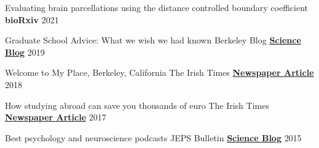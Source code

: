 

\begin{cvhonors}

  \cvhonor
    {Evaluating brain parcellations using the distance controlled boundary coefficient} %
    {}
    {{\textbf{bioRxiv}}}
    {2021}
    
\end{cvhonors}


\begin{cvhonors}

  \cvhonor
    {Graduate School Advice: What we wish we had known} %
    {Berkeley Blog}
    {\href{https://psychblog.berkeley.edu/opinion/2019/09/09/Graduate-School-Advice/}{\textbf{Science Blog}}}
    {2019}

  \cvhonor
    {Welcome to My Place, Berkeley, California} %
    {The Irish Times}
    {\href{https://www.irishtimes.com/life-and-style/abroad/welcome-to-my-place-berkeley-california-1.3325991}{\textbf{Newspaper Article}}}
    {2018}
    
  \cvhonor
    {How studying abroad can save you thousands of euro} %
    {The Irish Times}
    {\href{https://www.irishtimes.com/life-and-style/abroad/how-studying-abroad-can-save-you-thousands-of-euro-1.3219467}{\textbf{Newspaper Article}}}
    {2017}
    
  \cvhonor
  	{Best psychology and neuroscience podcasts} %
  	{JEPS Bulletin}
    {\href{https://blog.efpsa.org/2015/09/22/editors-pick-our-favourite-psychology-and-neuroscience-podcasts}{\textbf{Science Blog}}}
    {2015}   

\end{cvhonors}
